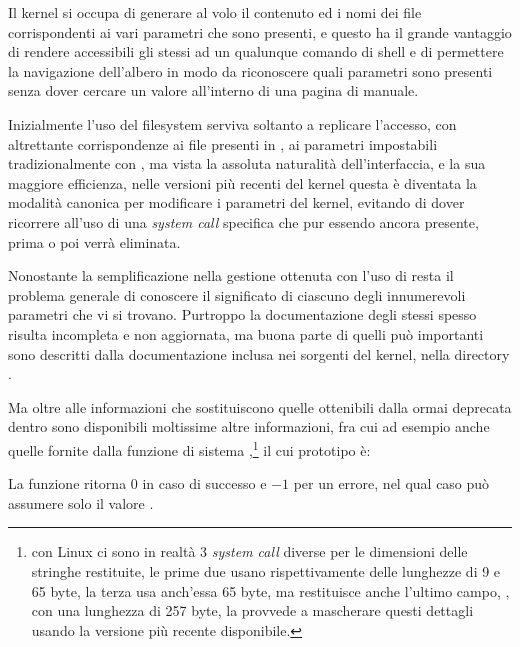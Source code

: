 Il kernel si occupa di generare al volo il contenuto ed i nomi dei file
corrispondenti ai vari parametri che sono presenti, e questo ha il grande
vantaggio di rendere accessibili gli stessi ad un qualunque comando di shell e
di permettere la navigazione dell'albero in modo da riconoscere quali
parametri sono presenti senza dover cercare un valore all'interno di una
pagina di manuale.

Inizialmente l'uso del filesystem  serviva soltanto a replicare
l'accesso, con altrettante corrispondenze ai file presenti in
, ai parametri impostabili tradizionalmente con ,
ma vista la assoluta naturalità dell'interfaccia, e la sua maggiore
efficienza, nelle versioni più recenti del kernel questa è diventata la
modalità canonica per modificare i parametri del kernel, evitando di dover
ricorrere all'uso di una \textit{system call} specifica che pur essendo ancora
presente, prima o poi verrà eliminata.

Nonostante la semplificazione nella gestione ottenuta con l'uso di
 resta il problema generale di conoscere il significato di
ciascuno degli innumerevoli parametri che vi si trovano. Purtroppo la
documentazione degli stessi spesso risulta incompleta e non aggiornata, ma
buona parte di quelli può importanti sono descritti dalla documentazione
inclusa nei sorgenti del kernel, nella directory .

Ma oltre alle informazioni che sostituiscono quelle ottenibili dalla ormai
deprecata  dentro  sono disponibili moltissime altre
informazioni, fra cui ad esempio anche quelle fornite dalla funzione di
sistema ,\footnote{con Linux ci sono in realtà 3 \textit{system
    call} diverse per le dimensioni delle stringhe restituite, le prime due
  usano rispettivamente delle lunghezze di 9 e 65 byte, la terza usa anch'essa
  65 byte, ma restituisce anche l'ultimo campo, , con una
  lunghezza di 257 byte, la  provvede a mascherare questi dettagli
  usando la versione più recente disponibile.} il cui prototipo è:

\begin{funcproto}{
}

{La funzione ritorna $0$ in caso di successo e $-1$ per un errore, nel qual
  caso  può assumere solo il valore .}  
\end{funcproto}

